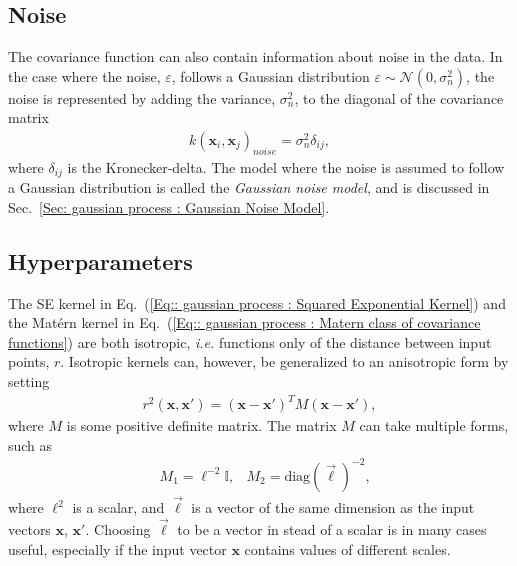 \documentclass[twoside,english]{uiofysmaster}
\begin{document}
\subsection{Noise}\label{Sec:: gaussian process : Noise Covariance Function}


The covariance function can also contain information about noise in the data. In the case where the noise, $\varepsilon$, follows a Gaussian distribution $\varepsilon \sim \mathcal{N}(0, \sigma_n^2)$, the noise is represented by adding the variance, $\sigma_n^2$, to the diagonal of the covariance matrix
\begin{align}
k(\textbf{x}_i, \textbf{x}_j)_{noise} = \sigma^2_n \delta_{ij},
\end{align}
where $\delta_{ij}$ is the Kronecker-delta. The model where the noise is assumed to follow a Gaussian distribution is called the \textit{Gaussian noise model}, and is discussed in Sec.~\ref{Sec: gaussian process : Gaussian Noise Model}. %

\subsection{Hyperparameters}\label{Sec:: gaussian process : Hyperparameters}

The SE kernel in Eq.~(\ref{Eq:: gaussian process : Squared Exponential Kernel}) and the Mat\'{e}rn kernel in Eq.~(\ref{Eq:: gaussian process : Matern class of covariance functions}) are both isotropic, \textit{i.e.} functions only of the distance between input points, $r$. Isotropic kernels can, however, be generalized to an anisotropic form by setting
\begin{align}
r^2(\textbf{x}, \textbf{x}') = (\textbf{x} - \textbf{x}')^T M(\textbf{x} - \textbf{x}'),
\end{align}
where $M$ is some positive definite matrix. The matrix $M$ can take multiple forms, such as 
\begin{align}
&M_1 = \ell^{-2} \mathbb{I} , &M_2 = \text{diag}(\vec{\ell})^{-2},
\end{align}
where $\ell^2$ is a scalar, and $\vec{\ell}$ is a vector of the same dimension as the input vectors $\textbf{x}$, $\textbf{x}'$. Choosing $\vec{\ell}$ to be a vector in stead of a scalar is in many cases useful, especially if the input vector $\textbf{x}$ contains values of different scales.
\end{document}
